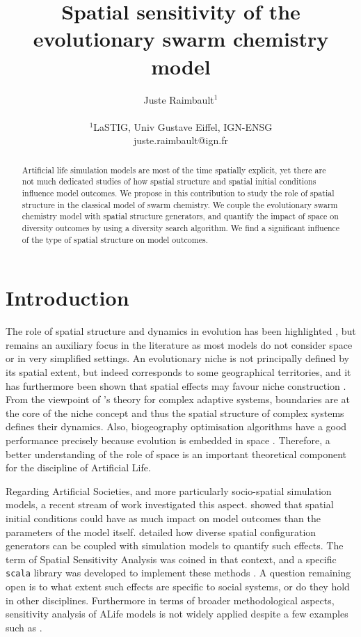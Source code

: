 \documentclass[letterpaper]{article}
\title{\vspace{-1.5cm}Spatial sensitivity of the evolutionary swarm chemistry model}
\author{
    Juste Raimbault$^{1}$\\
    \mbox{}\\
    $^1$LaSTIG, Univ Gustave Eiffel, IGN-ENSG\\
    juste.raimbault@ign.fr
} %
\begin{document}
\maketitle

\begin{abstract}
    Artificial life simulation models are most of the time spatially explicit, yet there are not much dedicated studies of how spatial structure and spatial initial conditions influence model outcomes. We propose in this contribution to study the role of spatial structure in the classical model of swarm chemistry. We couple the evolutionary swarm chemistry model with spatial structure generators, and quantify the impact of space on diversity outcomes by using a diversity search algorithm. We find a significant influence of the type of spatial structure on model outcomes.
\end{abstract}


\section{Introduction}

The role of spatial structure and dynamics in evolution has been highlighted \citep{lion2008self}, but remains an auxiliary focus in the literature as most models do not consider space or in very simplified settings. An evolutionary niche is not principally defined by its spatial extent, but indeed corresponds to some geographical territories, and it has furthermore been shown that spatial effects may favour niche construction \citep{silver2006spatial}. From the viewpoint of \cite{holland2012signals}'s theory for complex adaptive systems, boundaries are at the core of the niche concept and thus the spatial structure of complex systems defines their dynamics. Also, biogeography optimisation algorithms have a good performance precisely because evolution is embedded in space \citep{simon2008biogeography}. Therefore, a better understanding of the role of space is an important theoretical component for the discipline of Artificial Life.

Regarding Artificial Societies, and more particularly socio-spatial simulation models, a recent stream of work investigated this aspect. \cite{raimbault2019space} showed that spatial initial conditions could have as much impact on model outcomes than the parameters of the model itself. \cite{raimbault2023spatial} detailed how diverse spatial configuration generators can be coupled with simulation models to quantify such effects. The term of Spatial Sensitivity Analysis was coined in that context, and a specific \texttt{scala} library was developed to implement these methods \citep{raimbault2020scala}. A question remaining open is to what extent such effects are specific to social systems, or do they hold in other disciplines. Furthermore in terms of broader methodological aspects, sensitivity analysis of ALife models is not widely applied despite a few examples such as \citep{alden2014easing}.
\end{document}
